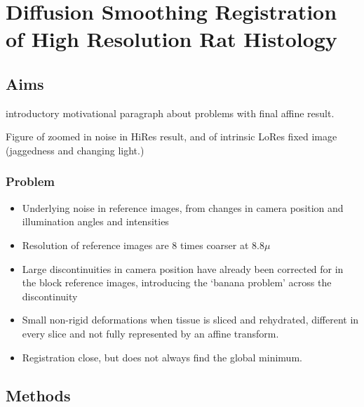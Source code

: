 \chapter{Diffusion Smoothing Registration of High Resolution Rat Histology}
\dblspace
\begin{quote}{\em }\end{quote}

\section{Aims} %
\label{sec:aims}
  introductory motivational paragraph about problems with final affine result.

  Figure of zoomed in noise in HiRes result, and of intrinsic LoRes fixed image (jaggedness and changing light.)
  \subsection{Problem}
    \begin{itemize}
      \item Underlying noise in reference images, from changes in camera position and illumination angles and intensities
      \item Resolution of reference images are 8 times coarser at 8.8$\mu$ 
      \item Large discontinuities in camera position have already been corrected for in the block reference images, introducing the `banana problem' across the discontinuity
      \item Small non-rigid deformations when tissue is sliced and rehydrated, different in every slice and not fully represented by an affine transform.
      \item Registration close, but does not always find the global minimum.
    \end{itemize}



\section{Methods} %
\label{sec:methods}
